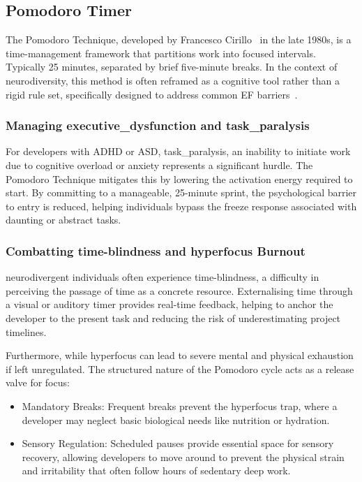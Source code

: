 \subsection{Pomodoro Timer}
The Pomodoro Technique, developed by Francesco Cirillo~\cite{cirillo2018pomodoro} in the late 1980s, is a time-management framework that partitions work into focused intervals. Typically
25 minutes, separated by brief five-minute breaks. In the context of \gls{neurodiversity}, this method is often reframed as a cognitive tool rather than a rigid 
rule set, specifically designed to address common \gls{EF} barriers~\cite{miller2025wired}.

\subsubsection{Managing \Gls{executive_dysfunction} and \Gls{task_paralysis}}
For developers with \gls{ADHD} or \gls{ASD}, \gls{task_paralysis}, an inability to initiate work due to cognitive overload or anxiety represents a significant hurdle. 
The Pomodoro Technique mitigates this by lowering the activation energy required to start. By committing to a manageable, 25-minute sprint, the psychological 
barrier to entry is reduced, helping individuals bypass the freeze response associated with daunting or abstract tasks.

\subsubsection{Combatting \Gls{time-blindness} and \Gls{hyperfocus} Burnout}
\Gls{neurodivergent} individuals often experience \gls{time-blindness}, a difficulty in perceiving the passage of time as a concrete resource. Externalising time through a visual 
or auditory timer provides real-time feedback, helping to anchor the developer to the present task and reducing the risk of underestimating project timelines.

Furthermore, while \gls{hyperfocus} can lead to severe mental and physical exhaustion if left unregulated. The structured 
nature of the Pomodoro cycle acts as a release valve for focus:
\begin{itemize}
\item Mandatory Breaks: Frequent breaks prevent the \gls{hyperfocus} trap, where a developer may neglect basic biological needs like nutrition or hydration.

\item Sensory Regulation: Scheduled pauses provide essential space for sensory recovery, allowing developers to move around to prevent the physical strain and irritability that often follow hours of sedentary deep work.
\end{itemize}

